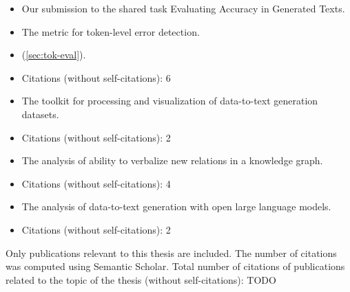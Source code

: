 \noindent{}
\begin{itemize}[noitemsep,topsep=0pt]
    \item Our submission to the shared task Evaluating Accuracy in Generated Texts.
    \item The metric for token-level error detection.
    \item (\autoref{sec:tok-eval}).
    \item Citations (without self-citations): 6

\end{itemize}\vspace{.5\baselineskip}


\noindent{}
\begin{itemize}[noitemsep,topsep=0pt]

    \item The toolkit for processing and visualization of data-to-text generation datasets.
    \item Citations (without self-citations): 2

\end{itemize}\vspace{.5\baselineskip}


\noindent{}
\begin{itemize}[noitemsep,topsep=0pt]

    \item The analysis of ability to verbalize new relations in a knowledge graph.
    \item Citations (without self-citations): 4

\end{itemize}\vspace{.5\baselineskip}


\noindent{}
\begin{itemize}[noitemsep,topsep=0pt]

    \item The analysis of data-to-text generation with open large language models.
    \item Citations (without self-citations): 2

\end{itemize}\vspace{.5\baselineskip}

\vfill

\noindent Only publications relevant to this thesis are included. The number of
citations was computed using Semantic Scholar. Total number of citations of
publications related to the topic of the thesis (without self-citations):
{\large TODO} %
